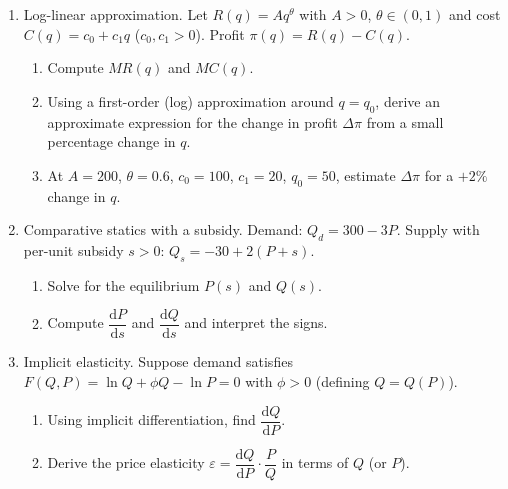 \documentclass[12pt]{article}
\begin{document}
\begin{enumerate}[resume]
\item Log-linear approximation. Let $R(q)=Aq^\theta$ with $A>0$, $\theta\in(0,1)$ and cost $C(q)=c_0+c_1 q$ ($c_0,c_1>0$). Profit $\pi(q)=R(q)-C(q)$.
\begin{enumerate}[label=(\alph*)]
  \item Compute $MR(q)$ and $MC(q)$.
  \item Using a first-order (log) approximation around $q=q_0$, derive an approximate expression for the change in profit $\Delta\pi$ from a small percentage change in $q$.
  \item At $A=200$, $\theta=0.6$, $c_0=100$, $c_1=20$, $q_0=50$, estimate $\Delta\pi$ for a $+2\%$ change in $q$.
\end{enumerate}

\item Comparative statics with a subsidy. Demand: $Q_d=300-3P$. Supply with per-unit subsidy $s>0$: $Q_s=-30+2(P+s)$.
\begin{enumerate}[label=(\alph*)]
  \item Solve for the equilibrium $P(s)$ and $Q(s)$.
  \item Compute $\dfrac{\mathrm{d}P}{\mathrm{d}s}$ and $\dfrac{\mathrm{d}Q}{\mathrm{d}s}$ and interpret the signs.
\end{enumerate}



\item Implicit elasticity. Suppose demand satisfies $F(Q,P)=\ln Q+\phi Q-\ln P=0$ with $\phi>0$ (defining $Q=Q(P)$).
\begin{enumerate}[label=(\alph*)]
  \item Using implicit differentiation, find $\dfrac{\mathrm{d}Q}{\mathrm{d}P}$.
  \item Derive the price elasticity $\varepsilon=\dfrac{\mathrm{d}Q}{\mathrm{d}P}\cdot \dfrac{P}{Q}$ in terms of $Q$ (or $P$).
\end{enumerate}



\end{enumerate}
\end{document}

